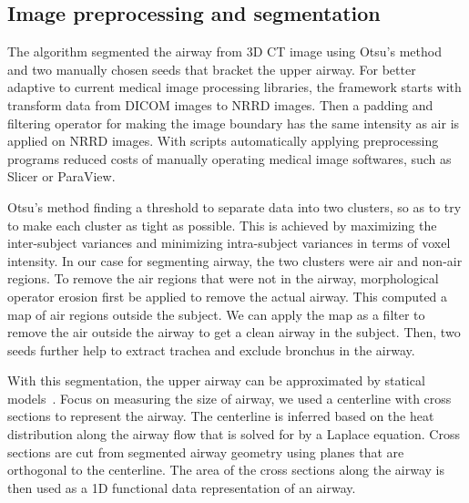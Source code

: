 \subsection{Image preprocessing and segmentation}
\label{sec:image_preprocessing_and_segmentation}
The algorithm segmented the airway from 3D CT image using Otsu's method and two manually chosen seeds that bracket the upper airway.
For better adaptive to current medical image processing libraries, the framework starts with transform data from DICOM images to NRRD images.
Then a padding and filtering operator for making the image boundary has the same intensity as air is applied on NRRD images.
With scripts automatically applying preprocessing programs reduced costs of manually operating medical image softwares, such as Slicer or ParaView.

Otsu's method finding a threshold to separate data into two clusters, so as to try to make each cluster as tight as possible.
This is achieved by maximizing the inter-subject variances and minimizing intra-subject variances in terms of voxel intensity.
In our case for segmenting airway, the two clusters were air and non-air regions.
To remove the air regions that were not in the airway, morphological operator erosion first be applied to remove the actual airway.
This computed a map of air regions outside the subject.
We can apply the map as a filter to remove the air outside the airway to get a clean airway in the subject.
Then, two seeds further help to extract trachea and exclude bronchus in the airway.

With this segmentation, the upper airway can be approximated by statical models~\cite{pizer2013nested}.
Focus on measuring the size of airway, we used a centerline with cross sections to represent the airway.
The centerline is inferred based on the heat distribution along the airway flow that is solved for by a Laplace equation.
Cross sections are cut from segmented airway geometry using planes that are orthogonal to the centerline. 
The area of the cross sections along the airway is then used as a 1D functional data representation of an airway.

